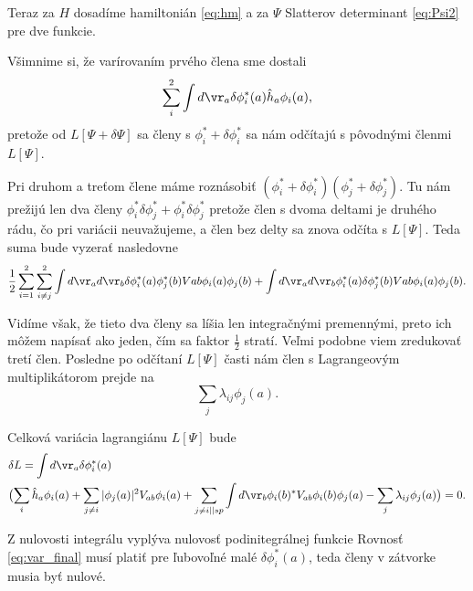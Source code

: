 Teraz za $H$ dosadíme hamiltonián \eqref{eq:hm} a za $\Psi$ Slatterov determinant \eqref{eq:Psi2} pre dve funkcie.

Všimnime si, že varírovaním prvého člena sme dostali
\begin{equation}
 \label{eq:var1}
 \sum_i^2 \int d\vr_a \delta\phi^*_i(a)\hat h_a \phi_i(a)\text{,}
\end{equation}
pretože od $L[\Psi+\delta\Psi]$ sa členy s $\phi^*_i+\delta\phi^*_i$ sa nám odčítajú s pôvodnými členmi $L[\Psi]$.

Pri druhom a treťom člene máme roznásobiť $(\phi^*_i+\delta\phi^*_i)(\phi^*_j+\delta\phi^*_j)$. Tu nám prežijú len dva členy $\phi^*_i\delta\phi^*_j + \phi^*_i\delta\phi^*_j$
pretože člen s dvoma deltami je druhého rádu, čo pri variácii neuvažujeme, a člen bez delty sa znova odčíta s $L[\Psi]$. Teda suma bude vyzerať nasledovne
\begin{equation}
 \label{eq:part_sum}
 \frac{1}{2} \sum_{i=1}^2{\sum_{i\neq j}^2 \int d\vr_a d\vr_b\delta\phi^*_i(a)\phi^*_j(b)Vab\phi_i(a)\phi_j(b)+ \int d\vr_a d\vr_b\phi^*_i(a)\delta\phi^*_j(b)Vab\phi_i(a)\phi_j(b)} \text{.}
\end{equation}


Vidíme však, že tieto dva členy sa líšia len integračnými premennými, preto ich môžem napísať ako jeden, čím sa faktor $\frac{1}{2}$ stratí. Veľmi podobne viem zredukovať tretí člen.
Posledne po odčítaní $L[\Psi]$ časti nám člen s Lagrangeovým multiplikátorom prejde na
\begin{equation}
 \label{eq:part_lagr}
 \sum_j{\lambda_{ij}\phi_j(a)} \text{.}
\end{equation}

Celková variácia lagrangiánu $L[\Psi]$ bude
\begin{align}
 \label{eq:var_final}
 &\delta L=\int d\vr_a\delta\phi_i^*(a) \\ \notag
 &\bigl(\sum_i\hat h_a \phi_i(a) +
 \sum_{j\neq i} |\phi_j(a)|^2V_{ab}\phi_i(a)+
 \sum_{j \neq i || sp}\int d\vr_b \phi_i(b)^*V_{ab}\phi_i(b)\phi_j(a)-
 \sum_j \lambda_{ij} \phi_j(a)\bigr)=0 \text{.}
\end{align}

Z nulovosti integrálu vyplýva nulovosť podinitegrálnej funkcie
Rovnosť \eqref{eq:var_final} musí platiť pre ľubovoľné malé $\delta \phi_i^*(a)$, teda
členy v zátvorke musia byť nulové.

